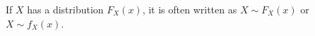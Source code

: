 If $X$ has a distribution $F_X (x)$, it is often written as $X \sim F_X(x)$ or $X \sim f_X (x)$.







































































